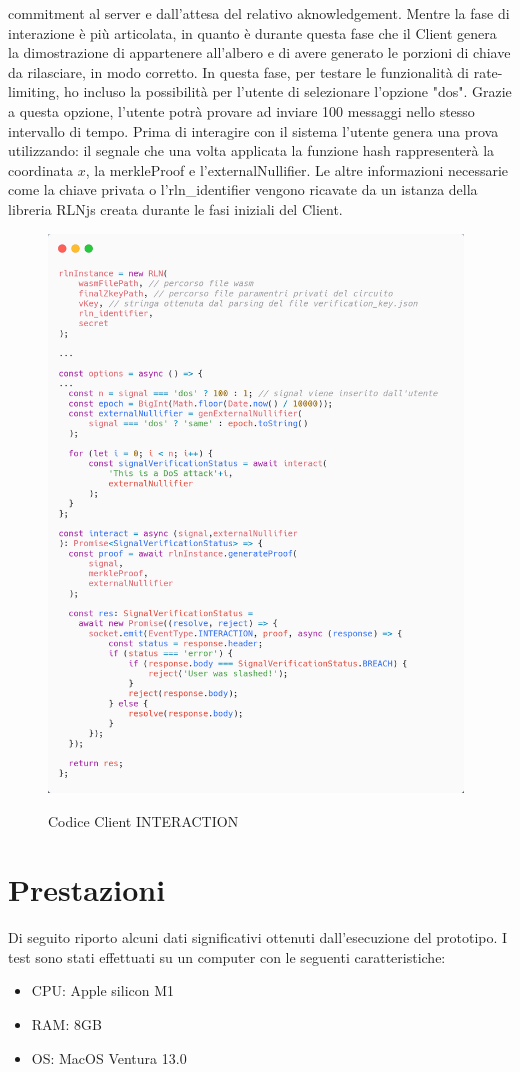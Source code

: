 commitment al server e dall'attesa del relativo aknowledgement. Mentre la fase di interazione è più articolata, in
quanto è durante questa fase che il Client genera la dimostrazione di appartenere all'albero e di avere generato le
porzioni di chiave da rilasciare, in modo corretto. In questa fase, per testare le funzionalità di rate-limiting, ho
incluso la possibilità per l'utente di selezionare l'opzione "dos". Grazie a questa opzione, l'utente potrà provare ad
inviare 100 messaggi nello stesso intervallo di tempo. Prima di interagire con il sistema l'utente genera una prova
utilizzando: il segnale che una volta applicata la funzione hash rappresenterà la coordinata $x$, la merkleProof e
l'externalNullifier. Le altre informazioni necessarie come la chiave privata o l'rln\_identifier vengono ricavate da un
istanza della libreria RLNjs creata durante le fasi iniziali del Client.
\begin{figure}[H]
    \centering
    \includegraphics[width=11cm]{./chapters/3.poc/images/4.2.client.png}
    \label{fig:2.client}
    \captionsetup{justification=centering}
    \caption{Codice Client INTERACTION}
\end{figure}

\section{Prestazioni}
Di seguito riporto alcuni dati significativi ottenuti dall'esecuzione del prototipo. I test sono stati effettuati su un
computer con le seguenti caratteristiche:
\begin{itemize}
    \item CPU: Apple silicon M1
    \item RAM: 8GB
    \item OS: MacOS Ventura 13.0
\end{itemize}

